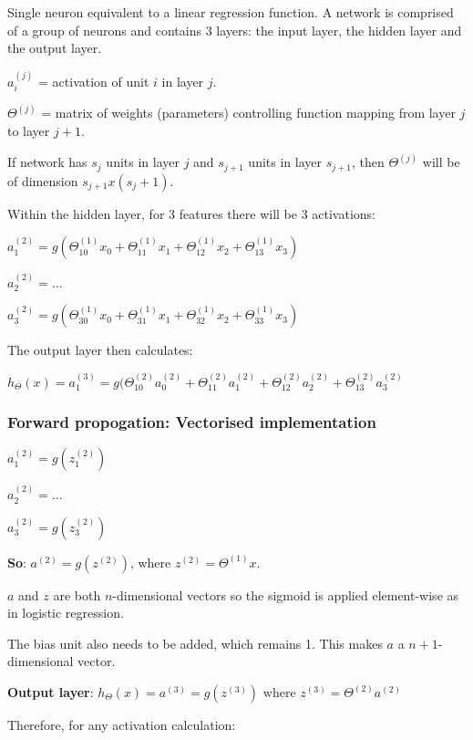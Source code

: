 \documentclass[12pt, a4paper]{article}
\begin{document}
    Single neuron equivalent to a linear regression function. A network is
    comprised of a group of neurons and contains 3 layers: the input layer, 
    the hidden layer and the output layer.

    $a_i^{(j)}$ = activation of unit $i$ in layer $j$. 

    $\Theta^{(j)}$ = matrix of weights (parameters) controlling function
    mapping from layer $j$ to layer $j+1$.

    If network has $s_j$ units in layer $j$ and $s_{j+1}$ units in layer
    $s_{j+1}$, then $\Theta^{(j)}$ will be of dimension $s_{j+1} x (s_j + 1)$.

    Within the hidden layer, for 3 features there will be 3 activations:

    $a_1^{(2)} = g(\Theta_{10}^{(1)} x_0 + \Theta_{11}^{(1)} x_1 + 
    \Theta_{12}^{(1)} x_2 + \Theta_{13}^{(1)} x_3)$

    $a_2^{(2)} = \dots$

    $a_3^{(2)} = g(\Theta_{30}^{(1)} x_0 + \Theta_{31}^{(1)} x_1 + 
    \Theta_{32}^{(1)} x_2 + \Theta_{33}^{(1)} x_3)$

    The output layer then calculates: 

    $h_\Theta(x) = a_1^{(3)} = g(\Theta_{10}^{(2)}a_0^{(2)} + 
    \Theta_{11}^{(2)}a_1^{(2)} + \Theta_{12}^{(2)}a_2^{(2)} +
    \Theta_{13}^{(2)}a_3^{(2)}$ 

    \subsubsection{Forward propogation: Vectorised implementation}
    
      $a_1^{(2)} = g(z_1^{(2)})$
      
      $a_2^{(2)} = \dots$

      $a_3^{(2)} = g(z_3^{(2)})$

      \textbf{So}: $a^{(2)} = g(z^{(2)})$, where $z^{(2)} = \Theta^{(1)}x$.

      $a$ and $z$ are both $n$-dimensional vectors so the sigmoid is applied 
      element-wise as in logistic regression.

      The bias unit also needs to be added, which remains 1. This makes $a$ a
      $n+1$-dimensional vector. 

      \textbf{Output layer}: $h_\Theta(x) = a^{(3)} = g(z^{(3)}) \text{ where }
      z^{(3)} = \Theta^{(2)}a^{(2)}$ 

      Therefore, for any activation calculation: 
      
\end{document}
